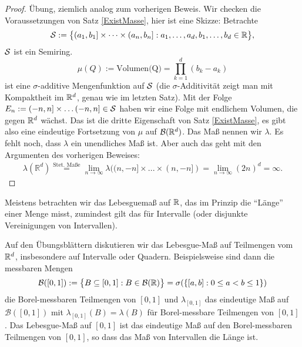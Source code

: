 \begin{proof}
	Übung, ziemlich analog zum vorherigen Beweis. Wir checken die Voraussetzungen von Satz \ref{ExistMasse}, hier ist eine Skizze: Betrachte $$\mathcal{S} := \big\{ (a_1,b_1]\times \dots \times (a_n,b_n] : a_1,\dots,a_d, b_1,\dots, b_d\in \mathbb{R}\big\},$$ $\mathcal{S}$ ist ein Semiring.
		 $$\mu(Q) := \text{Volumen(Q)} = \prod\limits_{k=1}^{d}(b_k-a_k)$$ ist eine $\sigma$-additive Mengenfunktion auf $\mathcal{S}$ (die $\sigma$-Additivit\"at zeigt man mit Kompaktheit im $\mathbb{R}^d$, genau wie im letzten Satz). Mit der Folge $E_n:=(-n,n]\times \dots (-n,n]\in \mathcal{S}$ haben wir eine Folge mit endlichem Volumen, die gegen $\mathbb{R}^d$ w\"achst. Das ist die dritte Eigenschaft von Satz \ref{ExistMasse}, es gibt also eine eindeutige Fortsetzung von $\mu$ auf $\mathcal B(\mathbb{R}^d)$. Das Ma\ss{} nennen wir $\lambda$. Es fehlt noch, dass $\lambda$ ein unendliches Ma\ss{} ist. Aber auch das geht mit den Argumenten des vorherigen Beweises:
		 \begin{align*}
		 \lambda(\mathbb{R}^d) \overset{\text{Stet. Ma\ss e}}{=}\lim\limits_{n \to \infty}\lambda ((n,-n]\times ... \times (n,-n])  = \lim\limits_{n \to \infty} (2n)^d= \infty.
		 \end{align*}
\end{proof}
Meistens betrachten wir das Lebesguema\ss{} auf $\mathbb{R}$, das im Prinzip die \enquote{L\"ange} einer Menge misst, zumindest gilt das f\"ur Intervalle (oder disjunkte Vereinigungen von Intervallen). 
\begin{bem}
	Auf den \"Ubungsbl\"attern diskutieren wir das Lebesgue-Ma\ss{} auf Teilmengen vom $\mathbb{R}^d$, insbesondere auf Intervalle oder Quadern.  Beispielsweise sind dann die messbaren Mengen
	\begin{align*}
		\mathcal B([0,1]) :=\big\{ B\subseteq [0,1]: B\in \mathcal B(\mathbb{R})\big\}=\sigma(\{[a,b]: 0\leq a<b\leq 1\})
	\end{align*}
	die Borel-messbaren Teilmengen von $[0,1]$ und $\lambda_{[0,1]}$ das eindeutige Ma\ss{} auf $\mathcal B([0,1])$ mit $\lambda_{[0,1]}(B)=\lambda(B)$ f\"ur Borel-messbare Teilmengen von $[0,1]$. Das Lebesgue-Ma\ss{} auf $[0,1]$ ist das eindeutige Ma\ss{} auf den Borel-messbaren Teilmengen von $[0,1]$, so dass das Ma\ss{} von Intervallen die L\"ange ist.	
\end{bem}

